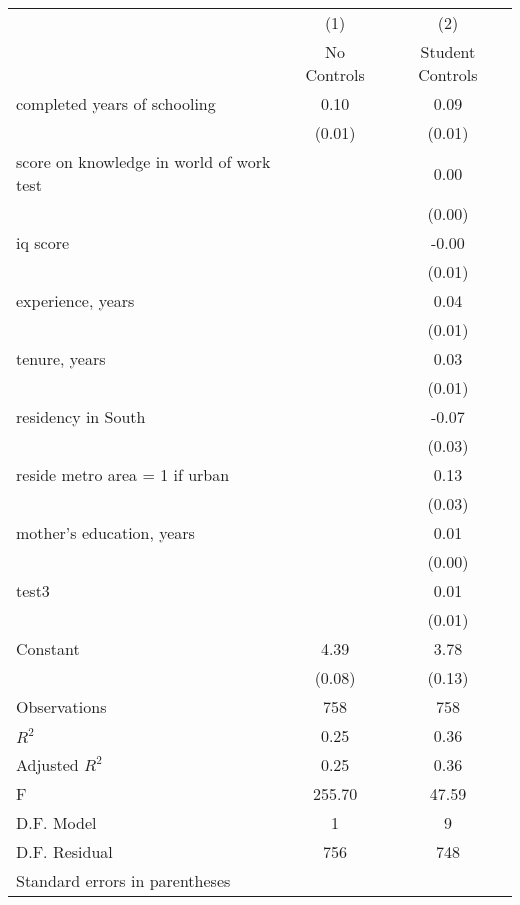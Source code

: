 \begin{tabular}{l*{2}{c}}
\hline\hline
                    &\multicolumn{1}{c}{(1)}&\multicolumn{1}{c}{(2)}\\
                    &\multicolumn{1}{c}{No Controls}&\multicolumn{1}{c}{Student Controls}\\
\hline
completed years of schooling&        0.10&        0.09\\
                    &      (0.01)&      (0.01)\\
[1em]
score on knowledge in world of work test&            &        0.00\\
                    &            &      (0.00)\\
[1em]
iq score            &            &       -0.00\\
                    &            &      (0.01)\\
[1em]
experience, years   &            &        0.04\\
                    &            &      (0.01)\\
[1em]
tenure, years       &            &        0.03\\
                    &            &      (0.01)\\
[1em]
residency in South  &            &       -0.07\\
                    &            &      (0.03)\\
[1em]
reside metro area = 1 if urban&            &        0.13\\
                    &            &      (0.03)\\
[1em]
mother's education, years&            &        0.01\\
                    &            &      (0.00)\\
[1em]
test3               &            &        0.01\\
                    &            &      (0.01)\\
[1em]
Constant            &        4.39&        3.78\\
                    &      (0.08)&      (0.13)\\
\hline
Observations        &         758&         758\\
\(R^{2}\)           &        0.25&        0.36\\
Adjusted \(R^{2}\)  &        0.25&        0.36\\
F                   &      255.70&       47.59\\
D.F. Model          &           1&           9\\
D.F. Residual       &         756&         748\\
\hline\hline
\multicolumn{3}{l}{\footnotesize Standard errors in parentheses}\\
\end{tabular}
